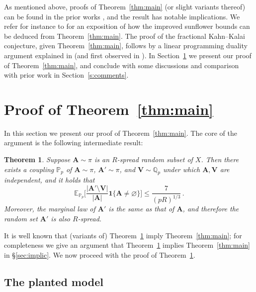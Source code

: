 \documentclass[11pt,reqno]{amsart}
\theoremstyle{plain}
\newtheorem{theorem}{Theorem}[section]
\theoremstyle{definition}
\theoremstyle{remark}
\newcommand{\Q}{\mathbb{Q}}
\newcommand{\PP}{\mathbb{P}}
\newcommand{\EE}{\mathbb{E}}
\newcommand{\beq}{\begin{equation}}
\newcommand{\eeq}{\end{equation}}
\newcommand{\bA}{\mathbf{A}}
\newcommand{\bV}{\mathbf{V}}
\renewcommand{\emptyset}{\varnothing}
\begin{document}
As mentioned above, proofs of Theorem~\ref{thm:main} (or slight variants thereof) can be found in the prior works  \cite{sunflower_annals, fracKK_annals,Rao_sunflower, Tao_sunflower},  and the result has notable implications.  We refer for instance to \cite{Tao_sunflower} for an exposition of how the improved sunflower bounds \cite{sunflower_annals} can be deduced from Theorem~\ref{thm:main}. The proof of the fractional Kahn--Kalai conjecture, given Theorem~\ref{thm:main}, follows by a linear programming duality argument explained in \cite[Proposition 1.5]{fracKK_annals} (and first observed in \cite{MR2743011}).  In Section~\ref{s:proof} we present our proof of Theorem~\ref{thm:main}, and conclude with some discussions and comparison with prior work in Section~\ref{s:comments}. 

\section{Proof of Theorem~\ref{thm:main}}
\label{s:proof}

In this section we present our proof of Theorem~\ref{thm:main}. The core of the argument is the following intermediate result:
\begin{theorem}\label{thm:medium} 
Suppose $\bA\sim\pi$ is an $R$-spread random subset of $X$. Then there exists a coupling $\PP_p$ of $\bA\sim\pi$, $\bA'\sim\pi$, and $\bV\sim\Q_p$ under which  $\bA,\bV$ are independent,  and it holds that
	\beq\label{iter_exp_mod}
	\EE_{\PP_p} \bigg[\frac{|\bA' \setminus \bV|}{|\bA|}
	\mathbf{1}\{\bA\ne\emptyset \}\bigg]
	\leq \frac{7}{(pR)^{1/3}} \,.
	\eeq
 Moreover,  the marginal law of $\bA'$ is the same as that of $\bA$,  and therefore 
the random set $\bA'$ is also $R$-spread.
\end{theorem}

It is well known that (variants of) Theorem~\ref{thm:medium} imply Theorem~\ref{thm:main}; for completeness we give an argument that Theorem~\ref{thm:medium} implies Theorem~\ref{thm:main} in \S\ref{sec:implic}. We now proceed with the proof of Theorem~\ref{thm:medium}.

\subsection{The planted model}
\end{document}
